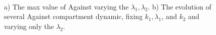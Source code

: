 \begin{figure}[h]
	\centering
	 \quad
	 \\
		\caption[Max against first case]{a) The max value of Against varying the $\lambda_1, \lambda_2$. b) The evolution of several Against compartment dynamic, fixing $k_1, \lambda_1$, and $k_2$ and varying only the $\lambda_2$.}
	\label{fig:max_against2}
\end{figure}

